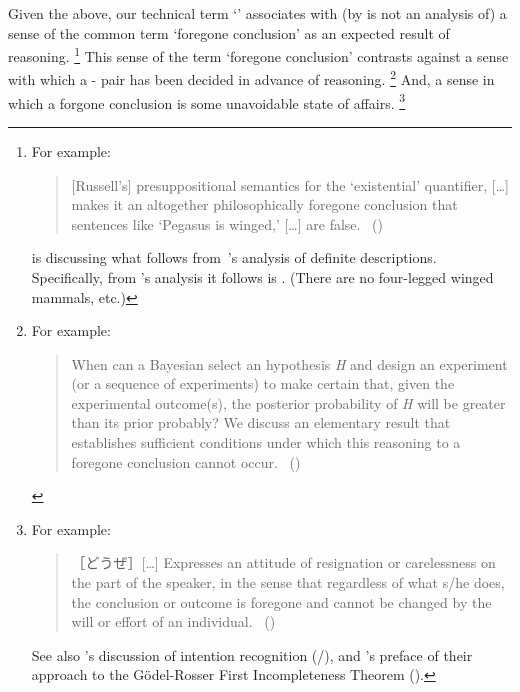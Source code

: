 \begin{note}
  Given the above, our technical term `\fc{}' associates with (by is not an analysis of) a sense of the common term `foregone conclusion' as an expected result of reasoning.%
  \footnote{
    For example:

    \begin{quote}
      [Russell's] presuppositional semantics for the ‘existential' quantifier, [\dots] makes it an altogether philosophically foregone conclusion that sentences like ‘Pegasus is winged,' [\dots] are false.%
      \mbox{ }\hfill\mbox{(\cite[6]{Jacquette:2002up})}
    \end{quote}

    \noindent \citeauthor{Jacquette:2002up} is discussing what follows from~\citeauthor{Russell:1905aa}'s analysis of definite descriptions.
    Specifically, from \citeauthor{Russell:1905aa}'s analysis it follows  is .
    (There are no four-legged winged mammals, etc.)
  }
  This sense of the term `foregone conclusion' contrasts against a sense with which a - pair has been decided in advance of reasoning.%
  \footnote{
    For example:
    \begin{quote}
      When can a Bayesian select an hypothesis \emph{H} and design an experiment (or a sequence of experiments) to make certain that, given the experimental outcome(s), the posterior probability of \emph{H} will be greater than its prior probably?
      We discuss an elementary result that establishes sufficient conditions under which this reasoning to a foregone conclusion cannot occur.%
      \mbox{ }\hfill\mbox{(\cite[1228]{Kadane:1996vu})}
    \end{quote}
  }
  And, a sense in which a forgone conclusion is some unavoidable state of affairs.%
  \footnote{
    For example:
    \begin{quote}
      ［どうぜ］[\dots] Expresses an attitude of resignation or carelessness on the part of the speaker, in the sense that regardless of what s/he does, the conclusion or outcome is foregone and cannot be changed by the will or effort of an individual.%
      \mbox{ }\hfill\mbox{(\cite[332--333]{kurufushamashii:2015un})}
    \end{quote}
    See also \citeauthor{Grice:1957vg}'s discussion of intention recognition (\citeyear[385]{Grice:1957vg}/\citeyear[219]{Grice:1989uf}), and \citeauthor{Machover:1996vu}'s preface of their approach to the G\"{o}del-Rosser First Incompleteness Theorem (\citeyear[viii]{Machover:1996vu}).
  }
\end{note}



